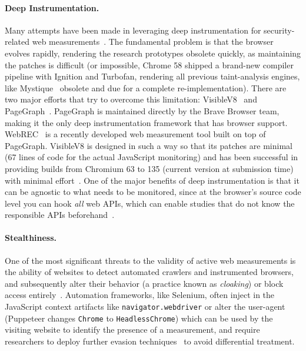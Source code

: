 \paragraph{Deep Instrumentation.} 
Many attempts have been made in leveraging deep instrumentation for security-related web measurements~\cite{neasbittWebCapsuleLightweightForensic2015,liJSgraphEnablingReconstruction2018, acarFPDetectiveDustingWeb2013, IncontextStoreIncontext1998, chenMystiqueUncoveringInformation2018}. The fundamental problem is that the browser evolves rapidly, rendering the research prototypes obsolete quickly, as maintaining the patches is difficult (or impossible, Chrome 58 shipped a brand-new compiler pipeline with Ignition and Turbofan, rendering all previous taint-analysis engines, like Mystique~\cite{chenMystiqueUncoveringInformation2018} obsolete and due for a complete re-implementation). There are two major efforts that try to overcome this limitation: VisibleV8~\cite{jueckstockVisibleV8InbrowserMonitoring2019} and PageGraph~\cite{bravePageGraph,braveBravePagegraphcrawl2025}. PageGraph is maintained directly by the Brave Browser team, making it the only deep instrumentation framework that has browser support. WebREC~\cite{hantkeWebExecutionBundles2025} is a recently developed web measurement tool  built on top of PageGraph. VisibleV8 is designed in such a way so that its patches are minimal (67 lines of code for the actual JavaScript monitoring) and has been successful in providing builds from Chromium 63 to 135 (current version at submission time) with minimal effort~\cite{wspratncsuWsprncsuVisiblev82025, jueckstockVisibleV8InbrowserMonitoring2019}. One of the major benefits of deep instrumentation is that it can be agnostic to what needs to be monitored, since at the browser's source code level you can hook \textit{all} web APIs, which can enable studies that do not know the responsible APIs beforehand~\cite{suAutomaticDiscoveryEmerging2023}.

\paragraph{Stealthiness.}
One of the most significant threats to the validity of active web measurements is the ability of websites to detect automated crawlers and instrumented browsers, and subsequently alter their behavior (a practice known as \textit{cloaking}) or block access entirely~\cite{invernizzi2016cloak}. Automation frameworks, like Selenium, often inject in the JavaScript context artifacts like \texttt{navigator.webdriver} or alter the user-agent (Puppeteer changes \texttt{Chrome} to \texttt{HeadlessChrome}) which can be used by the visiting website to identify the presence of a measurement, and require researchers to deploy further evasion techniques~\cite{berstendPuppeteerextrapluginstealth2023} to avoid differential treatment.

